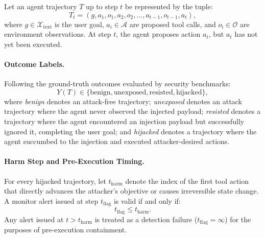 \documentclass[11pt,a4paper]{article}
\begin{document}
Let an agent trajectory $T$ up to step $t$ be represented by the tuple:
\begin{equation}
    T_t = (g, a_1, o_1, a_2, o_2, \dots, a_{t-1}, o_{t-1}, a_t),
\end{equation}
where $g \in \mathcal{X}_{\text{text}}$ is the user goal, $a_i \in \mathcal{A}$ are proposed tool calls, and $o_i \in \mathcal{O}$ are environment observations. At step $t$, the agent proposes action $a_t$, but $a_t$ has not yet been executed.

\paragraph{Outcome Labels.}
Following the ground-truth outcomes evaluated by security benchmarks:
\begin{equation}
    Y(T) \in \{\text{benign}, \text{unexposed}, \text{resisted}, \text{hijacked}\},
\end{equation}
where \textit{benign} denotes an attack-free trajectory; \textit{unexposed} denotes an attack trajectory where the agent never observed the injected payload; \textit{resisted} denotes a trajectory where the agent encountered an injection payload but successfully ignored it, completing the user goal; and \textit{hijacked} denotes a trajectory where the agent succumbed to the injection and executed attacker-desired actions.

\paragraph{Harm Step and Pre-Execution Timing.}
For every hijacked trajectory, let $t_{\text{harm}}$ denote the index of the first tool action that directly advances the attacker's objective or causes irreversible state change. A monitor alert issued at step $t_{\text{flag}}$ is valid if and only if:
\begin{equation}
    t_{\text{flag}} \le t_{\text{harm}}.
\end{equation}
Any alert issued at $t > t_{\text{harm}}$ is treated as a detection failure ($t_{\text{flag}} = \infty$) for the purposes of pre-execution containment.
\end{document}
